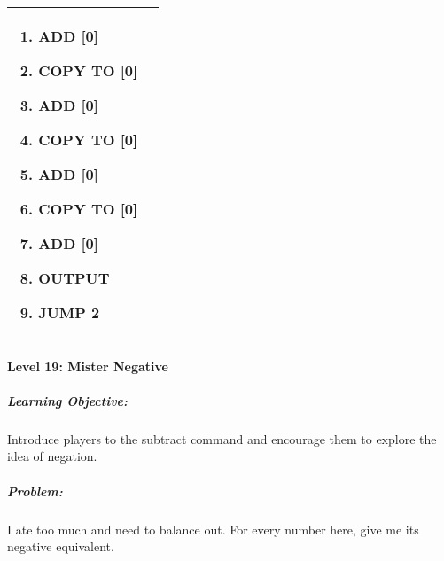 \begin{center}
\begin{tabular}{ | m{5cm} | m{9cm} | }
\begin{enumerate}
		\item ADD [0]
		\item COPY TO [0]
		\item ADD [0]
		\item COPY TO [0]
		\item ADD [0]
		\item COPY TO [0]
		\item ADD [0]
		\item OUTPUT
		\item JUMP 2
            \end{enumerate}
            \\
        \hline
    \end{tabular}
\end{center}


\paragraph{Level 19: Mister Negative}
\subparagraph{Learning Objective:} Introduce players to the subtract command and encourage them to explore the idea of negation.

\subparagraph{Problem:} I ate too much and need to balance out. For every number here, give me its negative equivalent.

